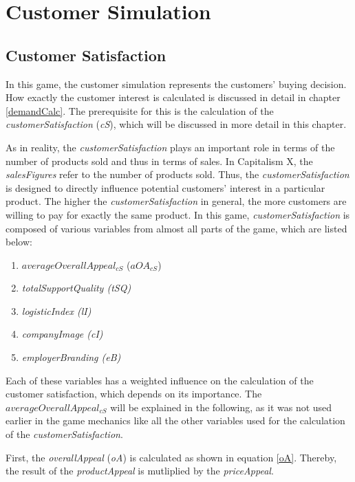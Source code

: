 \section{Customer Simulation} 
\label{sec:customsim}

\subsection{Customer Satisfaction}
\label{customerSatisfaction}
In this game, the customer simulation represents the customers' buying decision. How exactly the customer interest is calculated is discussed in detail in chapter \ref{demandCalc}. The prerequisite for this is the calculation of the \textit{customerSatisfaction} (\textit{\gls{cS}}), which will be discussed in more detail in this chapter.

As in reality, the \textit{customerSatisfaction} plays an important role in terms of the number of products sold and thus in terms of sales. \cite{deptolla_effects_2004} In Capitalism X, the \textit{salesFigures} refer to the number of products sold.
Thus, the \textit{customerSatisfaction} is designed to directly influence potential customers' interest in a particular product. The higher the \textit{customerSatisfaction} in general, the more customers are willing to pay for exactly the same product. 
In this game, \textit{customerSatisfaction} is composed of various variables from almost all parts of the game, which are listed below:
\begin{enumerate}
      \item $averageOverallAppeal_{cS}$ ($aOA_{cS}$)
      \item \textit{totalSupportQuality (tSQ)}
      \item \textit{logisticIndex (lI)}
      \item \textit{companyImage (cI)}
      \item \textit{employerBranding (eB)}
\end{enumerate}
Each of these variables has a weighted influence on the calculation of the customer satisfaction, which depends on its importance.
The $averageOverallAppeal_{cS} $ will be explained in the following, as it was not used earlier in the game mechanics like all the other variables used for the calculation of the \textit{customerSatisfaction}.

First, the \textit{overallAppeal} (\textit{\gls{oA}}) is calculated as shown in equation \ref{oA}. Thereby, the result of the \textit{productAppeal} is mutliplied by the \textit{priceAppeal}. 

